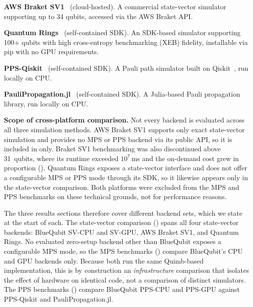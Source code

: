 \documentclass[conference,10pt]{IEEEtran}
\begin{document}
    \textbf{AWS Braket SV1}~\cite{aws_braket} (cloud-hosted). A commercial state-vector simulator supporting up to 34 qubits, accessed via the AWS Braket API.
     
    \textbf{Quantum Rings}~\cite{quantum_rings} (self-contained SDK). An SDK-based simulator supporting 100+ qubits with high cross-entropy benchmarking (XEB) fidelity, installable via pip with no GPU requirements.
     
    \textbf{PPS-Qiskit}~\cite{ppsqiskit} (self-contained SDK). A Pauli path simulator built on Qiskit~\cite{qiskit}, run locally on CPU.
     
    \textbf{PauliPropagation.jl}~\cite{paulipropagationjl} (self-contained SDK). A Julia-based Pauli propagation library, run locally on CPU.
     
    \noindent\textbf{Scope of cross-platform comparison.}
    Not every backend is evaluated across all three simulation methods. AWS Braket SV1 supports only exact state-vector simulation and provides no MPS or PPS backend via its public API, so it is included in  only. Braket SV1 benchmarking was also discontinued above 31~qubits, where its runtime exceeded $10^{7}$\,ms and the on-demand cost grew in proportion (). Quantum Rings exposes a state-vector interface and does not offer a configurable MPS or PPS mode through its SDK, so it likewise appears only in the state-vector comparison. Both platforms were excluded from the MPS and PPS benchmarks on these technical grounds, not for performance reasons.

    The three results sections therefore cover different backend sets, which we state at the start of each. The state-vector comparison () spans all four state-vector backends: BlueQubit SV-CPU and SV-GPU, AWS Braket SV1, and Quantum Rings. No evaluated zero-setup backend other than BlueQubit exposes a configurable MPS mode, so the MPS benchmarks () compare BlueQubit's CPU and GPU backends only. Because both run the same Quimb-based implementation, this is by construction an \emph{infrastructure} comparison that isolates the effect of hardware on identical code, not a comparison of distinct simulators. The PPS benchmarks () compare BlueQubit PPS-CPU and PPS-GPU against PPS-Qiskit and PauliPropagation.jl.
\end{document}

